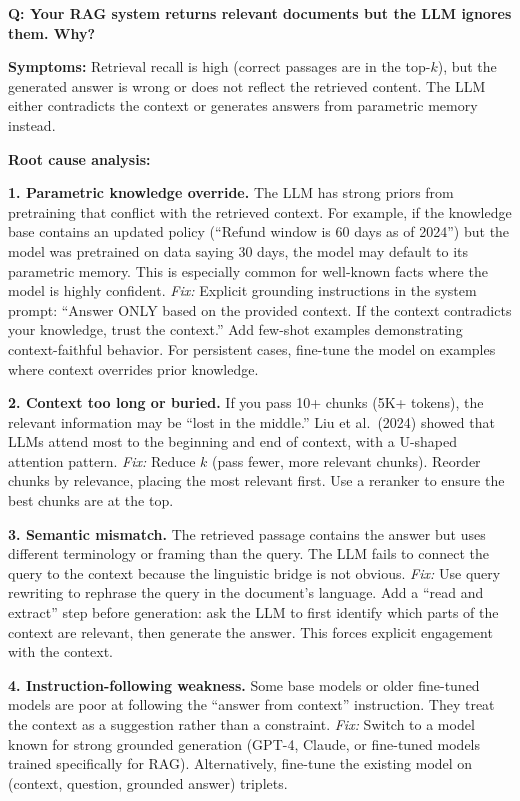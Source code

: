\begin{interviewq}
\textbf{Q: Your RAG system returns relevant documents but the LLM ignores them. Why?}

 \quad {} \quad \badgefreq{\freqhigh}

\stronganswer

\textbf{Symptoms:} Retrieval recall is high (correct passages are in the top-$k$), but the generated answer is wrong or does not reflect the retrieved content. The LLM either contradicts the context or generates answers from parametric memory instead.

\textbf{Root cause analysis:}

\textbf{1. Parametric knowledge override.} The LLM has strong priors from pretraining that conflict with the retrieved context. For example, if the knowledge base contains an updated policy (``Refund window is 60 days as of 2024'') but the model was pretrained on data saying 30 days, the model may default to its parametric memory. This is especially common for well-known facts where the model is highly confident.
\textit{Fix:} Explicit grounding instructions in the system prompt: ``Answer ONLY based on the provided context. If the context contradicts your knowledge, trust the context.'' Add few-shot examples demonstrating context-faithful behavior. For persistent cases, fine-tune the model on examples where context overrides prior knowledge.

\textbf{2. Context too long or buried.} If you pass 10+ chunks (5K+ tokens), the relevant information may be ``lost in the middle.'' Liu et al.\ (2024) showed that LLMs attend most to the beginning and end of context, with a U-shaped attention pattern.
\textit{Fix:} Reduce $k$ (pass fewer, more relevant chunks). Reorder chunks by relevance, placing the most relevant first. Use a reranker to ensure the best chunks are at the top.

\textbf{3. Semantic mismatch.} The retrieved passage contains the answer but uses different terminology or framing than the query. The LLM fails to connect the query to the context because the linguistic bridge is not obvious.
\textit{Fix:} Use query rewriting to rephrase the query in the document's language. Add a ``read and extract'' step before generation: ask the LLM to first identify which parts of the context are relevant, then generate the answer. This forces explicit engagement with the context.

\textbf{4. Instruction-following weakness.} Some base models or older fine-tuned models are poor at following the ``answer from context'' instruction. They treat the context as a suggestion rather than a constraint.
\textit{Fix:} Switch to a model known for strong grounded generation (GPT-4, Claude, or fine-tuned models trained specifically for RAG). Alternatively, fine-tune the existing model on (context, question, grounded answer) triplets.


\end{interviewq}
